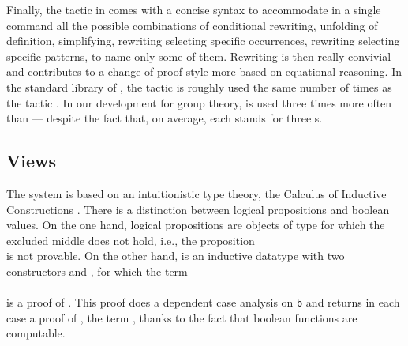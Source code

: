 Finally, the  tactic in \ssr{} comes with a concise syntax to accommodate
in a single command
all the possible combinations of conditional rewriting, unfolding of definition,
simplifying, rewriting selecting specific occurrences, rewriting selecting
specific patterns, to name only some of them. Rewriting is then really convivial 
and contributes to a change of proof style more based on equational reasoning. 
In the standard library of \Coq, the  tactic is roughly used the same number of times
as the tactic  .
In our development for group theory,  is used three times more often than
 --- despite the fact that, on average, each \ssr{} 
stands for three \Coq{} s.

\subsection{Views}\label{ssec:ssr}

The \Coq{} system is based on an intuitionistic type theory, the Calculus
of Inductive Constructions \cite{werner,paulin}. There is 
a distinction between logical propositions and boolean values.
On the one hand, logical propositions are objects
of type  for which the excluded middle does not hold, i.e.,
the proposition \\
is not provable. On the other hand,  is an
inductive datatype with two constructors  and , for
which the term \\
\quad{}\\
is a proof of . 
This proof does a dependent case analysis on {\tt b} and
returns in each case a proof of , the term ,
thanks to the fact that boolean functions are computable.

